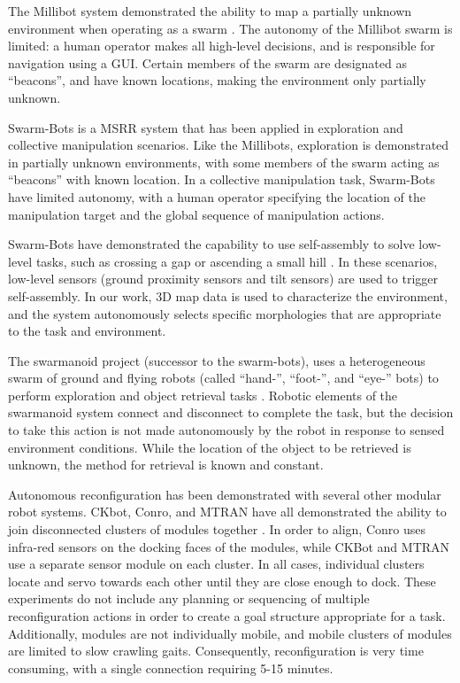 \documentclass[conference]{IEEEtran}
\begin{document}
The Millibot system demonstrated the ability to map a partially unknown environment when operating as a swarm \cite{Grabowski2000}. The autonomy of the Millibot swarm is limited: a human operator makes all high-level decisions, and is responsible for navigation using a GUI. Certain members of the swarm are designated as ``beacons'', and have known locations, making the environment only partially unknown.

Swarm-Bots is a MSRR system that has been applied in exploration \cite{Dorigo2005} and collective manipulation \cite{Mondada2005} scenarios.  Like the Millibots, exploration is demonstrated in partially unknown environments, with some members of the swarm acting as ``beacons'' with known location.  In a collective manipulation task, Swarm-Bots have limited autonomy, with a human operator specifying the location of the manipulation target and the global sequence of manipulation actions.

Swarm-Bots have demonstrated the capability to use self-assembly to solve low-level tasks, such as crossing a gap \cite{Mondada2004} or ascending a small hill \cite{OGrady2005}.  In these scenarios, low-level sensors (ground proximity sensors and tilt sensors) are used to trigger self-assembly.  In our work, 3D map data is used to characterize the environment, and the system autonomously selects specific morphologies that are appropriate to the task and environment. 

The swarmanoid project (successor to the swarm-bots), uses a heterogeneous swarm of ground and flying robots (called ``hand-'', ``foot-'', and ``eye-'' bots) to perform exploration and object retrieval tasks  \cite{Dorigo2013}. Robotic elements of the swarmanoid system connect and disconnect to complete the task, but the decision to take this action is not made autonomously by the robot in response to sensed environment conditions. While the location of the object to be retrieved is unknown, the method for retrieval is known and constant.

Autonomous reconfiguration has been demonstrated with several other modular robot systems. CKbot, Conro, and MTRAN have all demonstrated the ability to join disconnected clusters of modules together \cite{Yim2007, Rubenstein2004,Murata2006}. In order to align, Conro uses infra-red sensors on the docking faces of the modules, while CKBot and MTRAN use a separate sensor module on each cluster.  In all cases, individual clusters locate and servo towards each other until they are close enough to dock. These experiments do not include any planning or sequencing of multiple reconfiguration actions in order to create a goal structure appropriate for a task.  Additionally,  modules are not individually mobile, and mobile clusters of modules are limited to slow crawling gaits.  Consequently, reconfiguration is very time consuming, with a single connection requiring 5-15 minutes.
\end{document}
